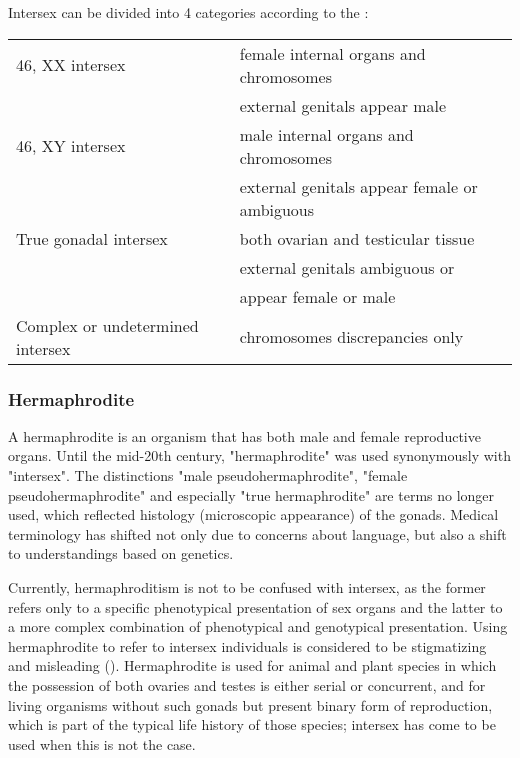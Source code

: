 Intersex can be divided into 4 categories according to the \cite{nlm}:

\begin{tabular}{ l l }
46, XX intersex & female internal organs and chromosomes \\
& external genitals appear male \\
46, XY intersex & male internal organs and chromosomes \\
& external genitals appear female or ambiguous \\
True gonadal intersex & both ovarian and testicular tissue \\
& external genitals ambiguous or \\
& appear female or male \\
Complex or undetermined intersex & chromosomes discrepancies only \\
\end{tabular}


\subsubsection{Hermaphrodite}
A hermaphrodite is an organism that has both male and female reproductive organs. Until the mid-20th century, "hermaphrodite" was used synonymously with "intersex". The distinctions "male pseudohermaphrodite", "female pseudohermaphrodite" and especially "true hermaphrodite" are terms no longer used, which reflected histology (microscopic appearance) of the gonads. Medical terminology has shifted not only due to concerns about language, but also a shift to understandings based on genetics.

Currently, hermaphroditism is not to be confused with intersex, as the former refers only to a specific phenotypical presentation of sex organs and the latter to a more complex combination of phenotypical and genotypical presentation. Using hermaphrodite to refer to intersex individuals is considered to be stigmatizing and misleading (\cite{is2013}). Hermaphrodite is used for animal and plant species in which the possession of both ovaries and testes is either serial or concurrent, and for living organisms without such gonads but present binary form of reproduction, which is part of the typical life history of those species; intersex has come to be used when this is not the case.


